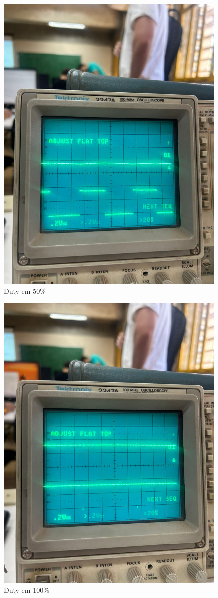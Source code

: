 \documentclass{article}
\begin{document}
\begin{figure}
    \centering
    \includegraphics[width=0.9\linewidth]{half_duty.jpeg}
    \caption{Duty em 50\%}
    \label{fig:halfduty}
\end{figure}

\begin{figure}
    \centering
    \includegraphics[width=0.9\linewidth]{full_duty.jpeg}
    \caption{Duty em 100\%}
    \label{fig:fullduty}
\end{figure}
\end{document}
